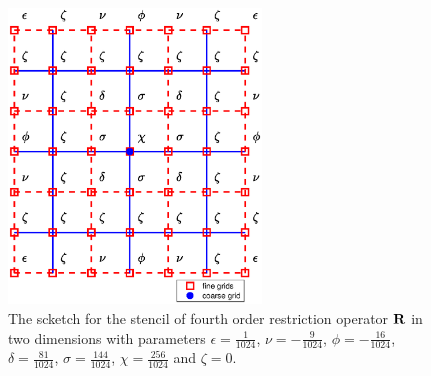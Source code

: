 \begin{figure}[htbp]
	\centering
	\includegraphics[width=0.6\textwidth]{restriction.eps}
	\caption{The scketch for the stencil of fourth order restriction operator ${\bf R}$ in two dimensions with parameters $\epsilon = \frac{1}{1024}$, $\nu = -\frac{9}{1024}$, $\phi = -\frac{16}{1024}$, $\delta = \frac{81}{1024}$, $\sigma = \frac{144}{1024}$, $\chi = \frac{256}{1024}$ and $\zeta = 0$.}\label{restriction}
\end{figure}


